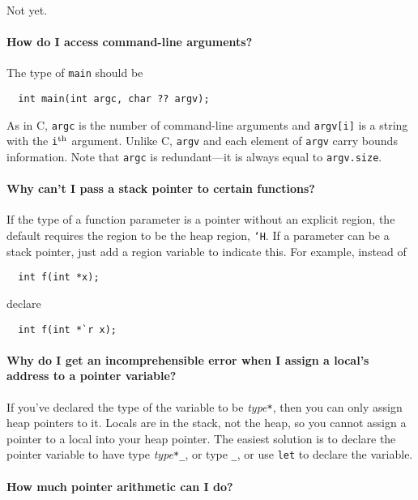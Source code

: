 Not yet. 

\paragraph{How do I access command-line arguments?}

The type of \texttt{main} should be
\begin{verbatim}
  int main(int argc, char ?? argv);
\end{verbatim}
As in C, \texttt{argc} is the number of command-line arguments and
\texttt{argv[i]} is a string with the \texttt{i}$^{\rm th}$ argument.
Unlike C, \texttt{argv} and each element of \texttt{argv} carry bounds
information.  Note that \texttt{argc} is redundant---it is always
equal to \texttt{argv.size}.

\paragraph{Why can't I pass a stack pointer to certain functions?}

If the type of a function parameter is a pointer without an explicit
region, the default requires the region to be the heap region,
\texttt{`H}.  If a parameter can be a stack pointer, just add a region
variable to indicate this.  For example, instead of
\begin{verbatim}
  int f(int *x);
\end{verbatim}
declare
\begin{verbatim}
  int f(int *`r x);
\end{verbatim}

\paragraph{Why do I get an incomprehensible error when I assign a
  local's address to a pointer variable?}

If you've declared the type of the variable to be
\textit{type}\texttt{*}, then you can only assign heap pointers to it.
Locals are in the stack, not the heap, so you cannot assign a pointer
to a local into your heap pointer.  The easiest solution is to declare
the pointer variable to have type \textit{type}\texttt{*_}, or type
\texttt{_}, or use \texttt{let} to declare the variable.

\paragraph{How much pointer arithmetic can I do?}

